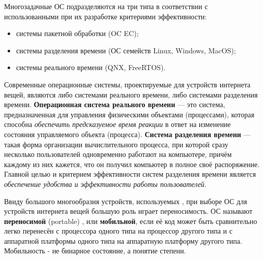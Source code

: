 Многозадачные ОС подразделяются на три типа в соответствии с использованными при их разработке критериями эффективности:
\begin{itemize}
	\item системы пакетной обработки (OC EC);
	\item системы разделения времени (ОС семейств Linux, Windows, MacOS);
	\item системы реального времени (QNX, FreeRTOS).
\end{itemize}
Современные операционные системы, проектируемые для устройств интернета вещей, являются либо системами реального времени, либо системами разделения времени. \textbf{Операционная система реального времени} \cite{Olifer} --- это система, предназначенная для управления физическими объектами (процессами), которая способна \textit{обеспечить предсказуемое время реакции} в ответ на изменение состояния управляемого объекта (процесса). \textbf{Система разделения времени} \cite{Olifer} --- такая форма организации вычислительного процесса, при которой сразу несколько пользователей одновременно работают на компьютере, причём каждому из них кажется, что он получил компьютер в полное своё распоряжение. Главной целью и критерием эффективности систем разделения времени является \textit{обеспечение удобства и эффективности работы пользователей}.

Ввиду большого многообразия устройств, используемых , при выборе ОС для устройств интернета вещей большую роль играет переносимость. ОС называют \textbf{переносимой} (portable) \cite{Olifer}, или \textbf{мобильной}, если её код может быть сравнительно легко перенесён с процессора одного типа на процессор другого типа и с аппаратной платформы одного типа на аппаратную платформу другого типа. Мобильность - не бинарное состояние, а понятие степени.

